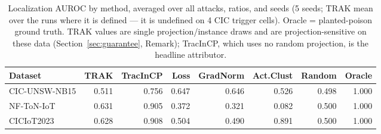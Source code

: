 \begin{table}[tbp]
\centering
\footnotesize
\setlength{\tabcolsep}{6pt}
\caption{Localization AUROC by method, averaged over all attacks, ratios, and seeds (5 seeds; TRAK mean over the runs where it is defined --- it is undefined on 4 CIC trigger cells). Oracle = planted-poison ground truth. TRAK values are single projection/instance draws and are projection-sensitive on these data (Section~\ref{sec:guarantee}, Remark); TracInCP, which uses no random projection, is the headline attributor.}
\label{tab:baselines}
\begin{tabular}{lrrrrrrr}
\toprule
Dataset & TRAK & TracInCP & Loss & GradNorm & Act.Clust & Random & Oracle \\
\midrule
CIC-UNSW-NB15 & 0.511 & 0.756 & 0.647 & 0.646 & 0.526 & 0.498 & 1.000 \\
NF-ToN-IoT & 0.631 & 0.905 & 0.372 & 0.321 & 0.082 & 0.500 & 1.000 \\
CICIoT2023 & 0.628 & 0.908 & 0.504 & 0.490 & 0.891 & 0.500 & 1.000 \\
\bottomrule
\end{tabular}
\end{table}
